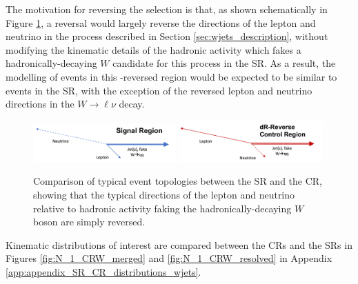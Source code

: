 The motivation for reversing the \DeltaR selection is that, as shown schematically in Figure \ref{fig:CRW_topology}, a \DeltaR reversal would largely reverse the directions of the lepton and neutrino in the \wjets process described in Section \ref{sec:wjets_description}, without modifying the kinematic details of the hadronic activity which fakes a hadronically-decaying \(W\) candidate for this process in the SR. As a result, the modelling of \wjets events in this \DeltaR-reversed region would be expected to be similar to \wjets events in the SR, with the exception of the reversed lepton and neutrino directions in the \(W\rightarrow\ell\nu\) decay.

\begin{figure}[htbp]
  \centering
  \includegraphics[width=0.49\textwidth]{Figures/5/SR_topology.pdf}
  \includegraphics[width=0.49\textwidth]{Figures/5/CRW_topology.pdf}
  \caption[Topologies in SR vs. CRW]{Comparison of typical event topologies between the SR and the \wjets CR, showing that the typical directions of the lepton and neutrino relative to hadronic activity faking the hadronically-decaying \(W\) boson are simply reversed.}
  \label{fig:CRW_topology}
\end{figure}

Kinematic distributions of interest are compared between the \wjets CRs and the SRs in Figures \ref{fig:N_1_CRW_merged} and \ref{fig:N_1_CRW_resolved} in Appendix \ref{app:appendix_SR_CR_distributions_wjets}. 


